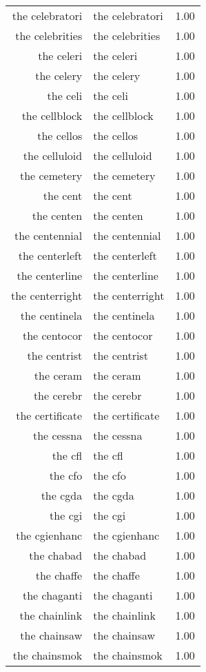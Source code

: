 \begin{table}[ht]
\begin{tabular}{rlr}
  the celebratori & the celebratori & 1.00 \\ 
  the celebrities & the celebrities & 1.00 \\ 
  the celeri & the celeri & 1.00 \\ 
  the celery & the celery & 1.00 \\ 
  the celi & the celi & 1.00 \\ 
  the cellblock & the cellblock & 1.00 \\ 
  the cellos & the cellos & 1.00 \\ 
  the celluloid & the celluloid & 1.00 \\ 
  the cemetery & the cemetery & 1.00 \\ 
  the cent & the cent & 1.00 \\ 
  the centen & the centen & 1.00 \\ 
  the centennial & the centennial & 1.00 \\ 
  the centerleft & the centerleft & 1.00 \\ 
  the centerline & the centerline & 1.00 \\ 
  the centerright & the centerright & 1.00 \\ 
  the centinela & the centinela & 1.00 \\ 
  the centocor & the centocor & 1.00 \\ 
  the centrist & the centrist & 1.00 \\ 
  the ceram & the ceram & 1.00 \\ 
  the cerebr & the cerebr & 1.00 \\ 
  the certificate & the certificate & 1.00 \\ 
  the cessna & the cessna & 1.00 \\ 
  the cfl & the cfl & 1.00 \\ 
  the cfo & the cfo & 1.00 \\ 
  the cgda & the cgda & 1.00 \\ 
  the cgi & the cgi & 1.00 \\ 
  the cgienhanc & the cgienhanc & 1.00 \\ 
  the chabad & the chabad & 1.00 \\ 
  the chaffe & the chaffe & 1.00 \\ 
  the chaganti & the chaganti & 1.00 \\ 
  the chainlink & the chainlink & 1.00 \\ 
  the chainsaw & the chainsaw & 1.00 \\ 
  the chainsmok & the chainsmok & 1.00 \\ 

\end{tabular}
\end{table}
